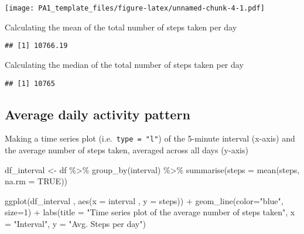 \documentclass[
]{article}
\newenvironment{Shaded}{\begin{snugshade}}{\end{snugshade}}
\newcommand{\AttributeTok}[1]{\textcolor[rgb]{0.77,0.63,0.00}{#1}}
\newcommand{\ConstantTok}[1]{\textcolor[rgb]{0.00,0.00,0.00}{#1}}
\newcommand{\DecValTok}[1]{\textcolor[rgb]{0.00,0.00,0.81}{#1}}
\newcommand{\FunctionTok}[1]{\textcolor[rgb]{0.00,0.00,0.00}{#1}}
\newcommand{\NormalTok}[1]{#1}
\newcommand{\OtherTok}[1]{\textcolor[rgb]{0.56,0.35,0.01}{#1}}
\newcommand{\SpecialCharTok}[1]{\textcolor[rgb]{0.00,0.00,0.00}{#1}}
\newcommand{\StringTok}[1]{\textcolor[rgb]{0.31,0.60,0.02}{#1}}
\begin{document}
\texttt{[image: PA1\_template\_files/figure-latex/unnamed-chunk-4-1.pdf]}

Calculating the mean of the total number of steps taken per day

\begin{Shaded}
\end{Shaded}

\begin{verbatim}
## [1] 10766.19
\end{verbatim}

Calculating the median of the total number of steps taken per day

\begin{Shaded}
\end{Shaded}

\begin{verbatim}
## [1] 10765
\end{verbatim}

\hypertarget{average-daily-activity-pattern}{%
\subsection{Average daily activity
pattern}\label{average-daily-activity-pattern}}

Making a time series plot (i.e.~\texttt{𝚝𝚢𝚙𝚎\ =\ "𝚕"}) of the 5-minute
interval (x-axis) and the average number of steps taken, averaged across
all days (y-axis)

\begin{Shaded}
\begin{Highlighting}[]
\NormalTok{df\_interval }\OtherTok{\textless{}{-}}\NormalTok{ df }\SpecialCharTok{\%\textgreater{}\%} \FunctionTok{group\_by}\NormalTok{(interval) }\SpecialCharTok{\%\textgreater{}\%} \FunctionTok{summarise}\NormalTok{(}\AttributeTok{steps =} \FunctionTok{mean}\NormalTok{(steps, }\AttributeTok{na.rm =} \ConstantTok{TRUE}\NormalTok{))}

\FunctionTok{ggplot}\NormalTok{(df\_interval , }\FunctionTok{aes}\NormalTok{(}\AttributeTok{x =}\NormalTok{ interval , }\AttributeTok{y =}\NormalTok{ steps)) }\SpecialCharTok{+} 
  \FunctionTok{geom\_line}\NormalTok{(}\AttributeTok{color=}\StringTok{"blue"}\NormalTok{, }\AttributeTok{size=}\DecValTok{1}\NormalTok{) }\SpecialCharTok{+} 
  \FunctionTok{labs}\NormalTok{(}\AttributeTok{title =} \StringTok{"Time series plot of the average number of steps taken"}\NormalTok{, }\AttributeTok{x =} \StringTok{"Interval"}\NormalTok{, }\AttributeTok{y =} \StringTok{"Avg. Steps per day"}\NormalTok{)}
\end{Highlighting}
\end{Shaded}
\end{document}
